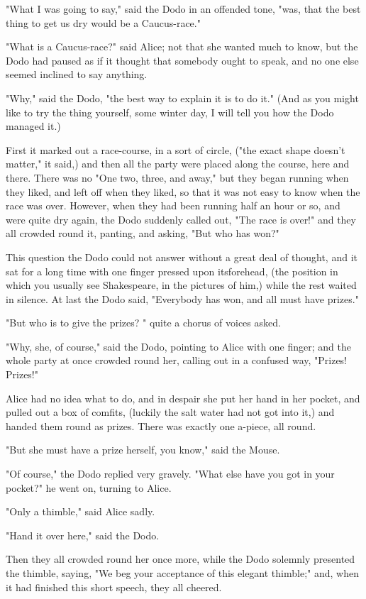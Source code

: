 "What I was going to say," said the Dodo in an offended tone, "was, that the best thing to get us dry would be a Caucus-race."

"What is a Caucus-race?" said Alice; not that she wanted much to know, but the Dodo ​had paused as if it thought that somebody ought to speak, and no one else seemed inclined to say anything.

"Why," said the Dodo, "the best way to explain it is to do it." (And as you might like to try the thing yourself, some winter day, I will tell you how the Dodo managed it.)

First it marked out a race-course, in a sort of circle, ("the exact shape doesn't matter," it said,) and then all the party were placed along the course, here and there. There was no "One two, three, and away," but they began running when they liked, and left off when they liked, so that it was not easy to know when the race was over. However, when they had been running half an hour or so, and were quite dry again, the Dodo suddenly called out, "The race is over!" and they all crowded round it, panting, and asking, "But who has won?"

This question the Dodo could not answer without a great deal of thought, and it sat for a long time with one finger pressed upon its ​forehead, (the position in which you usually see Shakespeare, in the pictures of him,) while the rest waited in silence. At last the Dodo said, "Everybody has won, and all must have prizes."

"But who is to give the prizes? " quite a chorus of voices asked.

"Why, she, of course," said the Dodo, pointing to Alice with one finger; and the whole party at once crowded round her, calling out in a confused way, "Prizes! Prizes!"

Alice had no idea what to do, and in despair she put her hand in her pocket, and pulled out a box of comfits, (luckily the salt water had not got into it,) and handed them round as prizes. There was exactly one a-piece, all round.

"But she must have a prize herself, you know," said the Mouse.

"Of course," the Dodo replied very gravely. "What else have you got in your pocket?" he went on, turning to Alice.

"Only a thimble," said Alice sadly.

"Hand it over here," said the Dodo.

Then they all crowded round her once more, while the Dodo solemnly presented the thimble, saying, "We beg your acceptance of this elegant thimble;" and, when it had finished this short speech, they all cheered.

